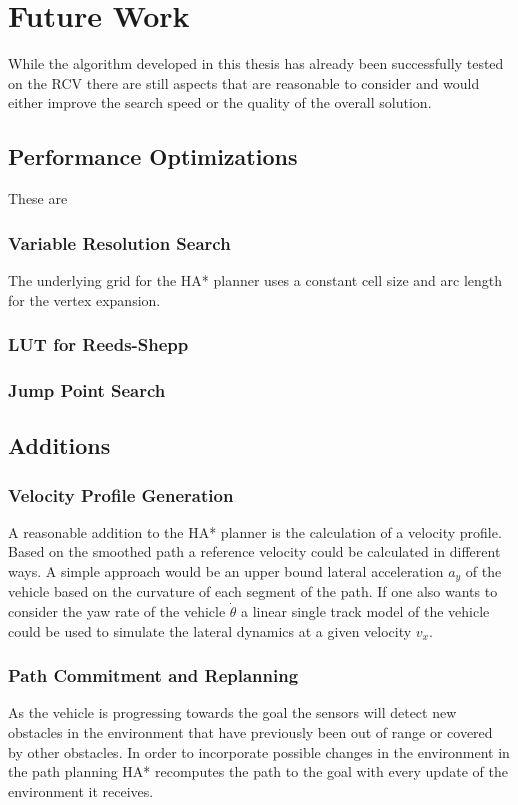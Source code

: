 \chapter{Future Work}
While the algorithm developed in this thesis has already been successfully tested on the RCV there are still aspects that are reasonable to consider and would either improve the search speed or the quality of the overall solution.

\section{Performance Optimizations}
These are 

\subsection{Variable Resolution Search}
The underlying grid for the HA* planner uses a constant cell size and arc length for the vertex expansion. 

\subsection{LUT for Reeds-Shepp}
	
\subsection{Jump Point Search}

\section{Additions}

\subsection{Velocity Profile Generation}
	A reasonable addition to the HA* planner is the calculation of a velocity profile. Based on the smoothed path a reference velocity could be calculated in different ways. A simple approach would be an upper bound lateral acceleration $a_y$ of the vehicle based on the curvature of each segment of the path. If one also wants to consider the yaw rate of the vehicle $\dot{\theta}$ a linear single track model of the vehicle could be used to simulate the lateral dynamics at a given velocity $v_x$. 

\subsection{Path Commitment and Replanning}
	As the vehicle is progressing towards the goal the sensors will detect new obstacles in the environment that have previously been out of range or covered by other obstacles. In order to incorporate possible changes in the environment in the path planning HA* recomputes the path to the goal with every update of the environment it receives.
	
